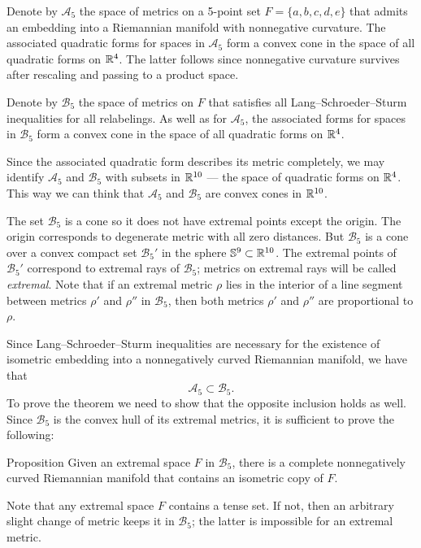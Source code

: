 \documentclass{article}
\begin{document}
Denote by $\mathcal{A}_5$ the space of metrics on a 5-point set $F=\{a,b,c,d,e\}$ that admits an embedding into a Riemannian manifold with nonnegative curvature.
The associated quadratic forms for spaces in $\mathcal{A}_5$ form a convex cone in the space of all quadratic forms on $\mathbb{R}^4$.
The latter follows since nonnegative curvature survives after rescaling and passing to a product space.

Denote by $\mathcal{B}_5$ the space of metrics on $F$ that satisfies all Lang--Schroeder--Sturm inequalities for all relabelings.
As well as for $\mathcal{A}_5$, the associated forms for spaces in $\mathcal{B}_5$ form a convex cone in the space of all quadratic forms on $\mathbb{R}^4$.

Since the associated quadratic form describes its metric completely, we may identify $\mathcal{A}_5$ and $\mathcal{B}_5$ with subsets in $\mathbb{R}^{10}$ --- the space of quadratic forms on $\mathbb{R}^4$.
This way we can think that $\mathcal{A}_5$ and $\mathcal{B}_5$ are convex cones in $\mathbb{R}^{10}$.

The set $\mathcal{B}_5$ is a cone so it does not have extremal points except the origin.
The origin corresponds to degenerate metric with all zero distances.
But $\mathcal{B}_5$ is a cone over a convex compact set $\mathcal{B}_5'$ in the sphere $\mathbb{S}^9\subset \mathbb{R}^{10}$.
The extremal points of $\mathcal{B}_5'$ correspond to extremal rays of $\mathcal{B}_5$;
metrics on extremal rays will be called \emph{extremal}.
Note that if an extremal metric $\rho$ lies in the interior of a line segment between metrics $\rho'$ and $\rho''$ in $\mathcal{B}_5$, then both metrics $\rho'$ and $\rho''$ are proportional to $\rho$.

Since Lang--Schroeder--Sturm inequalities are necessary for the existence of isometric embedding into a nonnegatively curved Riemannian manifold,
we have that 
\[\mathcal{A}_5\subset\mathcal{B}_5.\]
To prove the theorem we need to show that the opposite inclusion holds as well.
Since $\mathcal{B}_5$ is the convex hull of its extremal metrics, it is sufficient to prove the following:

\begin{thm}{Proposition}\label{prop:main}
Given an extremal space $F$ in $\mathcal{B}_5$, there is a complete nonnegatively curved Riemannian manifold that contains an isometric copy of $F$.
\end{thm}

Note that any extremal space  $F$ contains a tense set.
If not, then an arbitrary slight change of metric keeps it in $\mathcal{B}_5$;
the latter is impossible for an extremal metric.
\end{document}
